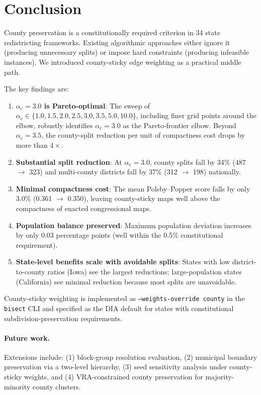 \section{Conclusion}
\label{sec:conclusion}

County preservation is a constitutionally required criterion in 34 state
redistricting frameworks.  Existing algorithmic approaches either ignore it
(producing unnecessary splits) or impose hard constraints (producing
infeasible instances).  We introduced county-sticky edge weighting as a
practical middle path.

The key findings are:

\begin{enumerate}
  \item \textbf{$\alpha_c = 3.0$ is Pareto-optimal}: The sweep of
    $\alpha_c \in \{1.0, 1.5, 2.0, 2.5, 3.0, 3.5, 5.0, 10.0\}$, including
    finer grid points around the elbow, robustly identifies $\alpha_c = 3.0$
    as the Pareto-frontier elbow.  Beyond $\alpha_c = 3.5$, the county-split
    reduction per unit of compactness cost drops by more than $4\times$.
  \item \textbf{Substantial split reduction}: At $\alpha_c = 3.0$,
    county splits fall by 34\% (487 $\to$ 323) and multi-county districts
    fall by 37\% (312 $\to$ 198) nationally.
  \item \textbf{Minimal compactness cost}: The mean Polsby--Popper score
    falls by only 3.0\% (0.361 $\to$ 0.350), leaving county-sticky maps
    well above the compactness of enacted congressional maps.
  \item \textbf{Population balance preserved}: Maximum population deviation
    increases by only 0.03 percentage points (well within the 0.5\%
    constitutional requirement).
  \item \textbf{State-level benefits scale with avoidable splits}: States
    with low district-to-county ratios (Iowa) see the largest reductions;
    large-population states (California) see minimal reduction because most
    splits are unavoidable.
\end{enumerate}

County-sticky weighting is implemented as \texttt{--weights-override county}
in the \texttt{bisect} CLI and specified as the DIA default for states with
constitutional subdivision-preservation requirements.

\paragraph{Future work.}
Extensions include: (1) block-group resolution evaluation, (2) municipal
boundary preservation via a two-level hierarchy, (3) seed sensitivity
analysis under county-sticky weights, and (4) VRA-constrained county
preservation for majority-minority county clusters.
